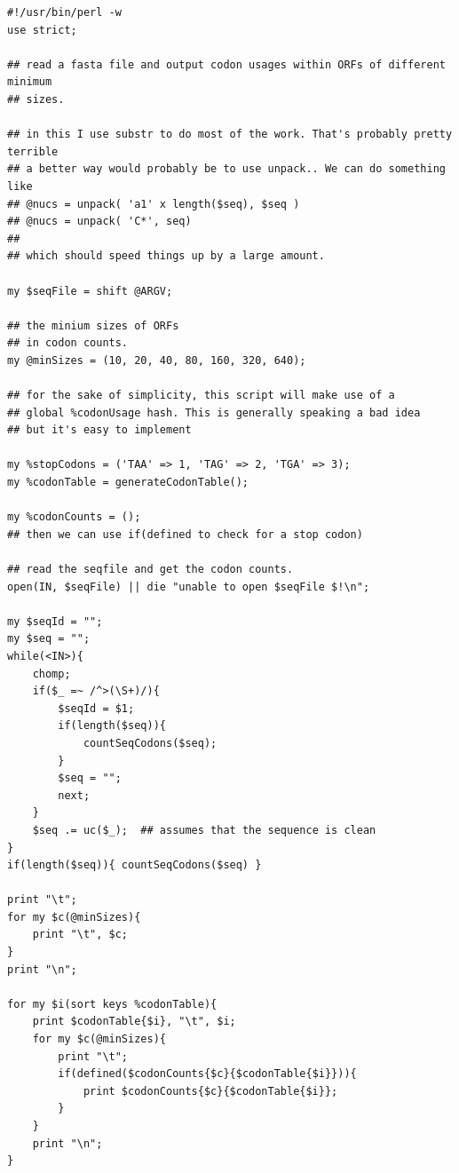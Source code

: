 \documentclass[11pt]{article}
\begin{document}
\begin{verbatim}
#!/usr/bin/perl -w
use strict;

## read a fasta file and output codon usages within ORFs of different minimum
## sizes. 

## in this I use substr to do most of the work. That's probably pretty terrible
## a better way would probably be to use unpack.. We can do something like
## @nucs = unpack( 'a1' x length($seq), $seq )
## @nucs = unpack( 'C*', seq)
## 
## which should speed things up by a large amount.

my $seqFile = shift @ARGV;

## the minium sizes of ORFs
## in codon counts.
my @minSizes = (10, 20, 40, 80, 160, 320, 640);

## for the sake of simplicity, this script will make use of a
## global %codonUsage hash. This is generally speaking a bad idea
## but it's easy to implement

my %stopCodons = ('TAA' => 1, 'TAG' => 2, 'TGA' => 3);
my %codonTable = generateCodonTable();

my %codonCounts = (); 
## then we can use if(defined to check for a stop codon)

## read the seqfile and get the codon counts.
open(IN, $seqFile) || die "unable to open $seqFile $!\n";

my $seqId = "";
my $seq = "";
while(<IN>){
    chomp;
    if($_ =~ /^>(\S+)/){
        $seqId = $1;  
        if(length($seq)){
            countSeqCodons($seq);
        }
        $seq = "";
        next;
    }
    $seq .= uc($_);  ## assumes that the sequence is clean
}
if(length($seq)){ countSeqCodons($seq) }

print "\t";
for my $c(@minSizes){
    print "\t", $c;
}
print "\n";

for my $i(sort keys %codonTable){
    print $codonTable{$i}, "\t", $i;
    for my $c(@minSizes){
        print "\t";
        if(defined($codonCounts{$c}{$codonTable{$i}})){
            print $codonCounts{$c}{$codonTable{$i}};
        }
    }
    print "\n";
}
\end{verbatim}
\end{document}
